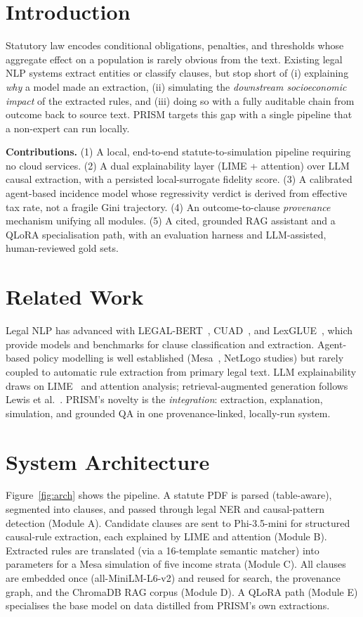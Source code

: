 \documentclass[conference]{IEEEtran}
\begin{document}
\section{Introduction}
Statutory law encodes conditional obligations, penalties, and thresholds whose
aggregate effect on a population is rarely obvious from the text. Existing legal
NLP systems extract entities or classify clauses, but stop short of (i)
explaining \emph{why} a model made an extraction, (ii) simulating the
\emph{downstream socioeconomic impact} of the extracted rules, and (iii) doing
so with a fully auditable chain from outcome back to source text. PRISM targets
this gap with a single pipeline that a non-expert can run locally.

\textbf{Contributions.} (1) A local, end-to-end statute-to-simulation pipeline
requiring no cloud services. (2) A dual explainability layer (LIME + attention)
over LLM causal extraction, with a persisted local-surrogate fidelity score.
(3) A calibrated agent-based incidence model whose regressivity verdict is
derived from effective tax rate, not a fragile Gini trajectory. (4) An
outcome-to-clause \emph{provenance} mechanism unifying all modules. (5) A cited,
grounded RAG assistant and a QLoRA specialisation path, with an evaluation
harness and LLM-assisted, human-reviewed gold sets.

\section{Related Work}
Legal NLP has advanced with LEGAL-BERT~\cite{chalkidis2020legalbert},
CUAD~\cite{hendrycks2021cuad}, and LexGLUE~\cite{chalkidis2022lexglue}, which
provide models and benchmarks for clause classification and extraction.
Agent-based policy modelling is well established
(Mesa~\cite{kazil2020mesa}, NetLogo studies) but rarely coupled to automatic
rule extraction from primary legal text. LLM explainability draws on
LIME~\cite{ribeiro2016lime} and attention analysis; retrieval-augmented
generation follows Lewis et al.~\cite{lewis2020rag}. PRISM's novelty is the
\emph{integration}: extraction, explanation, simulation, and grounded QA in one
provenance-linked, locally-run system.

\section{System Architecture}
Figure~\ref{fig:arch} shows the pipeline. A statute PDF is parsed
(table-aware), segmented into clauses, and passed through legal NER and
causal-pattern detection (Module A). Candidate clauses are sent to Phi-3.5-mini
for structured causal-rule extraction, each explained by LIME and attention
(Module B). Extracted rules are translated (via a 16-template semantic matcher)
into parameters for a Mesa simulation of five income strata (Module C). All
clauses are embedded once (all-MiniLM-L6-v2) and reused for search, the
provenance graph, and the ChromaDB RAG corpus (Module D). A QLoRA path (Module
E) specialises the base model on data distilled from PRISM's own extractions.
\end{document}
